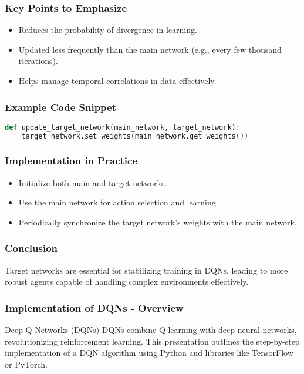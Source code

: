 \documentclass[aspectratio=169]{beamer}
\begin{document}
\begin{frame}[fragile]
    \frametitle{Key Points to Emphasize}
    \begin{itemize}
        \item Reduces the probability of divergence in learning.
        \item Updated less frequently than the main network (e.g., every few thousand iterations).
        \item Helps manage temporal correlations in data effectively.
    \end{itemize}
\end{frame}

\begin{frame}[fragile]
    \frametitle{Example Code Snippet}
    \begin{lstlisting}[language=Python]
def update_target_network(main_network, target_network):
    target_network.set_weights(main_network.get_weights())
    \end{lstlisting}
\end{frame}

\begin{frame}[fragile]
    \frametitle{Implementation in Practice}
    \begin{itemize}
        \item Initialize both main and target networks.
        \item Use the main network for action selection and learning.
        \item Periodically synchronize the target network's weights with the main network.
    \end{itemize}
\end{frame}

\begin{frame}[fragile]
    \frametitle{Conclusion}
    \begin{block}{}
        Target networks are essential for stabilizing training in DQNs, leading to more robust agents capable of handling complex environments effectively.
    \end{block}
\end{frame}

\begin{frame}[fragile]
    \frametitle{Implementation of DQNs - Overview}
    \begin{block}{Deep Q-Networks (DQNs)}
        DQNs combine Q-learning with deep neural networks, revolutionizing reinforcement learning.
        This presentation outlines the step-by-step implementation of a DQN algorithm using Python and libraries like TensorFlow or PyTorch.
    \end{block}
\end{frame}
\end{document}
